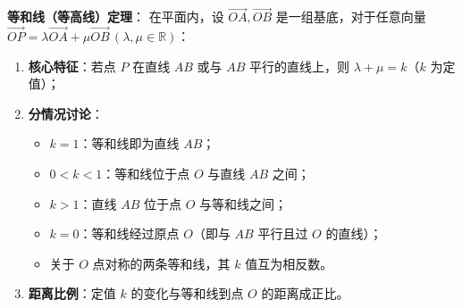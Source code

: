 \begin{statementbox}
\textbf{等和线（等高线）定理}：
在平面内，设 $\vec{OA}, \vec{OB}$ 是一组基底，对于任意向量 $\vec{OP} = \lambda\vec{OA} + \mu\vec{OB} \, (\lambda, \mu \in \mathbb{R})$：
\begin{enumerate}
    \item \textbf{核心特征}：若点 $P$ 在直线 $AB$ 或与 $AB$ 平行的直线上，则 $\lambda + \mu = k$（$k$ 为定值）；
    \item \textbf{分情况讨论}：
    \begin{itemize}
        \item $k=1$：等和线即为直线 $AB$；
        \item $0 < k < 1$：等和线位于点 $O$ 与直线 $AB$ 之间；
        \item $k > 1$：直线 $AB$ 位于点 $O$ 与等和线之间；
        \item $k = 0$：等和线经过原点 $O$（即与 $AB$ 平行且过 $O$ 的直线）；
        \item 关于 $O$ 点对称的两条等和线，其 $k$ 值互为相反数。
    \end{itemize}
    \item \textbf{距离比例}：定值 $k$ 的变化与等和线到点 $O$ 的距离成正比。
\end{enumerate}
\end{statementbox}